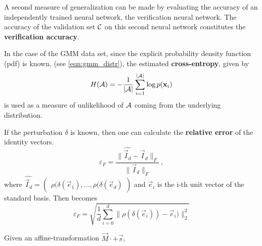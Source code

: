 A second measure of generalization can be made by evaluating the accuracy of an
independently trained neural network, the verification neural network.
The accuracy of the validation set $\mathcal C$ on this second neural network 
constitutes the \textbf{verification accuracy}.

In the case of the GMM data set, since the explicit probability density function (pdf) is known, 
(see \ref{eqn:gmm_distr}), the estimated \textbf{cross-entropy}, given by
\begin{equation}
\label{eqn:cross_entropy}
    H(\mathcal A) = - \frac 1 {|\mathcal A|} \sum_{i=1}^{|\mathcal A|} \log p(\mathbf x_i)
\end{equation}
is used as a measure of unlikelihood of $\mathcal A$ coming from the underlying distribution.


If the perturbation $\delta$ is known, then one can calculate the \textbf{relative error} of the identity vectors. 
\begin{equation}
\label{eqn:fro_error}
    \varepsilon_F = \frac {\|\widehat {\vec I_d} - \vec I_d\|_F} {\|\vec I_d\|_F} \,,
\end{equation}
where $\widehat {\vec I_d} = \begin{pmatrix} \rho (\delta (\vec e_1), \dots, \rho (\delta (\vec e_d) \end{pmatrix}$ and $\vec e_i$ is the i-th unit vector of the standard basis.
%
Then  becomes
\begin{equation}
\label{eqn:l2_error}
    \varepsilon_F = \sqrt{ \frac 1 d \sum_{i=0}^d \|\rho (\delta (\vec e_i)) - \vec e_i)\|_2^2}
\end{equation}

Given an affine-transformation $\vec M \cdot + \vec s$,

